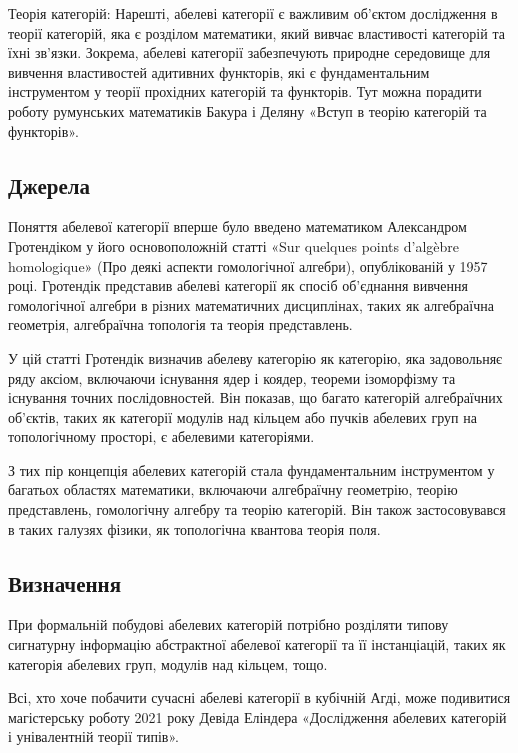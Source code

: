 Теорія категорій: Нарешті, абелеві категорії є важливим об'єктом
дослідження в теорії категорій, яка є розділом математики, який
вивчає властивості категорій та їхні зв'язки. Зокрема, абелеві
категорії забезпечують природне середовище для вивчення властивостей
адитивних функторів, які є фундаментальним інструментом у теорії
прохідних категорій та функторів. Тут можна порадити роботу румунських
математиків Бакура і Деляну «Вступ в теорію категорій та функторів».

\subsection*{Джерела}

Поняття абелевої категорії вперше було введено математиком
Александром Гротендіком у його основоположній статті «Sur quelques
points d'algèbre homologique» (Про деякі аспекти гомологічної алгебри),
опублікованій у 1957 році. Гротендік представив абелеві категорії як
спосіб об'єднання вивчення гомологічної алгебри в різних математичних
дисциплінах, таких як алгебраїчна геометрія, алгебраїчна топологія та
теорія представлень.

У цій статті Гротендік визначив абелеву категорію як категорію,
яка задовольняє ряду аксіом, включаючи існування ядер і коядер,
теореми ізоморфізму та існування точних послідовностей. Він показав,
що багато категорій алгебраїчних об'єктів, таких як категорії модулів
над кільцем або пучків абелевих груп на топологічному просторі, є абелевими категоріями.

З тих пір концепція абелевих категорій стала фундаментальним
інструментом у багатьох областях математики, включаючи алгебраїчну
геометрію, теорію представлень, гомологічну алгебру та теорію категорій.
Він також застосовувався в таких галузях фізики, як топологічна квантова теорія поля.

\subsection*{Визначення}

При формальній побудові абелевих категорій потрібно розділяти
типову сигнатурну інформацію абстрактної абелевої категорії
та її інстанціацій, таких як категорія абелевих груп, модулів над кільцем, тощо.

Всі, хто хоче побачити сучасні абелеві категорії в кубічній Агді,
може подивитися магістерську роботу 2021 року Девіда Еліндера «Дослідження
абелевих категорій і унівалентній теорії типів».

